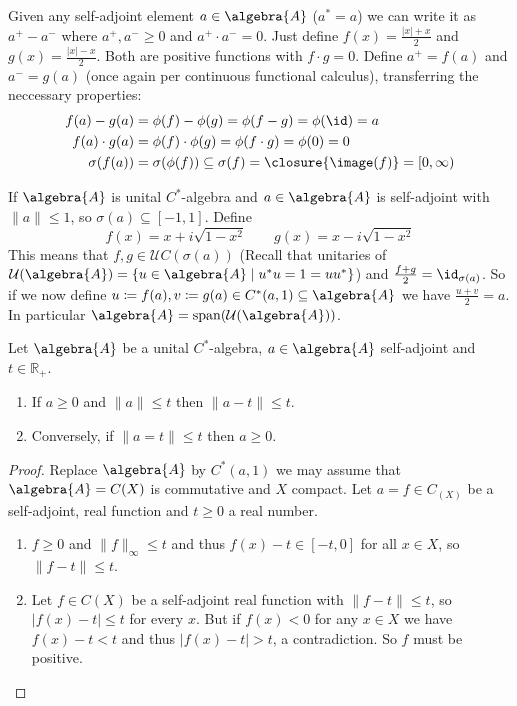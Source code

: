 \documentclass[a4paper]{article}
\begin{document}
\begin{remark}
	Given any self-adjoint element $a \in \algebra{A}$ ($a^* = a$) we can write it as $a^+ - a^-$ where $a^+, a^- \geq 0$ and $a^+ \cdot a^- = 0$.
	Just define $f(x) = \frac{|x| + x}{2}$ and $g(x) = \frac{|x| - x}{2}$.
	Both are positive functions with $f \cdot g = 0$. Define $a^+ = f(a)$ and $a^- = g(a)$ (once again per continuous functional calculus), transferring the neccessary properties:
	\begin{align*}
		f(a) - g(a) &= \phi(f) - \phi(g) = \phi(f - g) = \phi(\id) = a \\
		f(a) \cdot g(a) &= \phi(f) \cdot \phi(g) = \phi(f \cdot g) = \phi(0) = 0\\
		\sigma(f(a)) &= \sigma(\phi(f)) \subseteq \sigma(f) = \closure{\image(f)} = [0, \infty)
	\end{align*}
\end{remark}

\begin{remark}
	If $\algebra{A}$ is unital $C^*$-algebra and $a \in \algebra{A}$ is self-adjoint with $\|a\| \leq 1$, so $\sigma(a) \subseteq [-1, 1]$.
	Define 
	\begin{equation*}
		f(x) = x + i \sqrt{1 - x^2} \qquad g(x) = x - i \sqrt{1 - x^2}
	\end{equation*}
	This means that $f,g \in \mathcal{U}C(\sigma(a))$
	(Recall that unitaries of $\mathcal{U}(\algebra{A}) = \{u \in \algebra{A} \mid u^* u = 1 = uu^* \}$)
	and $\frac{f + g}{2} = \id_{\sigma(a)}$.
	So if we now define $u \coloneq f(a), v \coloneq g(a) \in C^*(a,1) \subseteq  \algebra{A}$ we have $\frac{u + v}{2} = a$.
	In particular $\algebra{A} = \mathrm{span}(\mathcal{U}(\algebra{A}))$.
\end{remark}

\begin{lemma}
	Let $\algebra{A}$ be a unital $C^*$-algebra, $a \in \algebra{A}$ self-adjoint and $t \in \mathds{R}_+$.
	\begin{enumerate}
		\item If $a \geq 0$ and $\|a\| \leq t$ then $\|a - t\| \leq t$.
		\item Conversely, if $\|a = t\| \leq t$ then $a \geq 0$.
	\end{enumerate}
\end{lemma}

\begin{proof}
	Replace $\algebra{A}$ by $C^*(a, 1)$ we may assume that $\algebra{A} = C(X)$ is commutative and $X$ compact.
	Let $a = f \in C_(X)$ be a self-adjoint, real function and $t \geq 0$ a real number.
	\begin{enumerate}
		\item $f \geq 0$ and $\|f\|_\infty \leq t$ and thus $f(x) - t \in [-t, 0]$ for all $x \in X$, so $\|f - t\| \leq t$.
		\item Let $f \in C(X)$ be a self-adjoint real function with $\|f - t\| \leq t$, so $|f(x) - t| \leq t$ for every $x$.
		But if $f(x) < 0$ for any $x \in X$ we have $f(x) - t < t$ and thus $|f(x) - t| > t$, a contradiction.
		So $f$ must be positive.
	\end{enumerate}
\end{proof}
\end{document}
